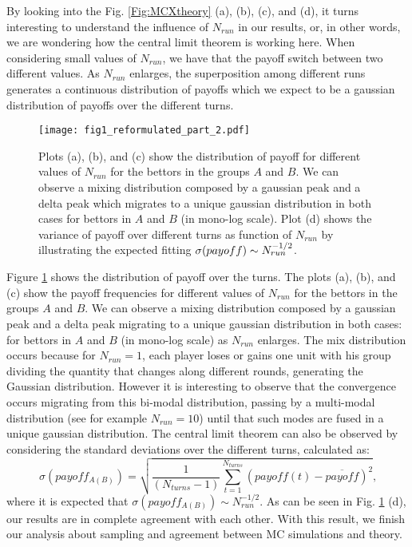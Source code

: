 \documentclass[3p, 11pt]{elsarticle}
\begin{document}
By looking into the Fig. \ref{Fig:MCXtheory} (a), (b), (c), and (d), it
turns interesting to understand the influence of $N_{run}$ in our results,
or, in other words, we are wondering how the central limit theorem is
working here. When considering small values of $N_{run}$, we have that the
payoff switch between two different values. As $N_{run}$ enlarges, the
superposition among different runs generates a continuous distribution of
payoffs which we expect to be a gaussian distribution of payoffs over the
different turns. 
\begin{figure}[h]
\begin{center}
\texttt{[image: fig1\_reformulated\_part\_2.pdf]}
\end{center}
\caption{Plots (a), (b), and (c) show the distribution of payoff for
different values of $N_{run}$ for the bettors in the groups $A$ and $B$. We
can observe a mixing distribution composed by a gaussian peak and a delta
peak which migrates to a unique gaussian distribution in both cases for
bettors in $A$ and $B$ (in mono-log scale). Plot (d) shows the variance of
payoff over different turns as function of $N_{run}$ by illustrating the
expected fitting $\protect\sigma (payoff)\sim N_{run}^{-1/2}$.}
\label{Fig_distributions}
\end{figure}

Figure \ref{Fig_distributions} shows the distribution of payoff over the
turns. The plots (a), (b), and (c) show the payoff frequencies for different
values of $N_{run}$ for the bettors in the groups $A$ and $B$. We can
observe a mixing distribution composed by a gaussian peak and a delta peak
migrating to a unique gaussian distribution in both cases: for bettors in $A$
and $B$ (in mono-log scale) as $N_{run}$ enlarges. The mix distribution
occurs because for $N_{run}=1$, each player loses or gains one unit with his
group dividing the quantity that changes along different rounds, generating
the Gaussian distribution. However it is interesting to observe that the
convergence occurs migrating from this bi-modal distribution, passing by a
multi-modal distribution (see for example $N_{run}=10$) until that such
modes are fused in a unique gaussian distribution. The central limit theorem
can also be observed by considering the standard deviations over the
different turns, calculated as: 
\begin{equation}
\sigma (payoff_{A(B)})=\sqrt{\frac{1}{(N_{turns}-1)}\sum_{t=1}^{N_{turns}}%
\left( payoff(t)-\overline{payoff}\right) ^{2}}\text{,}
\label{Eq:var_payoff}
\end{equation}%
where it is expected that $\sigma (payoff_{A(B)})\sim N_{run}^{-1/2}$. As
can be seen in Fig. \ref{Fig_distributions} (d), our results are in complete
agreement with each other. With this result, we finish our analysis about
sampling and agreement between MC simulations and theory.
\end{document}
